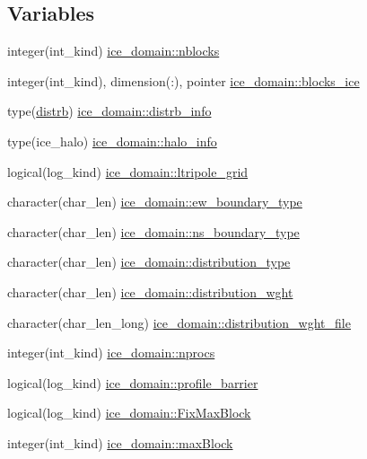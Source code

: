 \subsection*{Variables}
\begin{DoxyCompactItemize}
\item 
integer(int\_\-kind) \hyperlink{namespaceice__domain_aae3d2de717ee7a743c9635b3a9e35a95}{ice\_\-domain::nblocks}
\item 
integer(int\_\-kind), dimension(:), pointer \hyperlink{namespaceice__domain_a152cf5087ce1dccce8f5e147306320ae}{ice\_\-domain::blocks\_\-ice}
\item 
type(\hyperlink{typeice__distribution_1_1distrb}{distrb}) \hyperlink{namespaceice__domain_af84e6e4ee8c3c2d04326e26048f003b1}{ice\_\-domain::distrb\_\-info}
\item 
type(ice\_\-halo) \hyperlink{namespaceice__domain_a06df1ee3a618bfdd4e7f6445a5376604}{ice\_\-domain::halo\_\-info}
\item 
logical(log\_\-kind) \hyperlink{namespaceice__domain_aec6b06cf3394cb064898a46434391258}{ice\_\-domain::ltripole\_\-grid}
\item 
character(char\_\-len) \hyperlink{namespaceice__domain_a56566cef9f35bb56cb7a97e73ce17acc}{ice\_\-domain::ew\_\-boundary\_\-type}
\item 
character(char\_\-len) \hyperlink{namespaceice__domain_a50e350eed39ec93fdfef517e4b45b5a5}{ice\_\-domain::ns\_\-boundary\_\-type}
\item 
character(char\_\-len) \hyperlink{namespaceice__domain_a9c80809a4e6a48707a7ef1f2eb795ea5}{ice\_\-domain::distribution\_\-type}
\item 
character(char\_\-len) \hyperlink{namespaceice__domain_a89743a68c52b19112e09ab35a820ff26}{ice\_\-domain::distribution\_\-wght}
\item 
character(char\_\-len\_\-long) \hyperlink{namespaceice__domain_a010eb9c42e0d853d313f922f3ddecf93}{ice\_\-domain::distribution\_\-wght\_\-file}
\item 
integer(int\_\-kind) \hyperlink{namespaceice__domain_afcc67a62427b0b7620d366168d6a42ff}{ice\_\-domain::nprocs}
\item 
logical(log\_\-kind) \hyperlink{namespaceice__domain_a8f4a0f7b5e1a37ba6e8e8e64dd040267}{ice\_\-domain::profile\_\-barrier}
\item 
logical(log\_\-kind) \hyperlink{namespaceice__domain_a2d52e3f832101d05076304dedcbfd465}{ice\_\-domain::FixMaxBlock}
\item 
integer(int\_\-kind) \hyperlink{namespaceice__domain_ae245e03a7c30b2d04cbd99256514fe65}{ice\_\-domain::maxBlock}
\end{DoxyCompactItemize}

